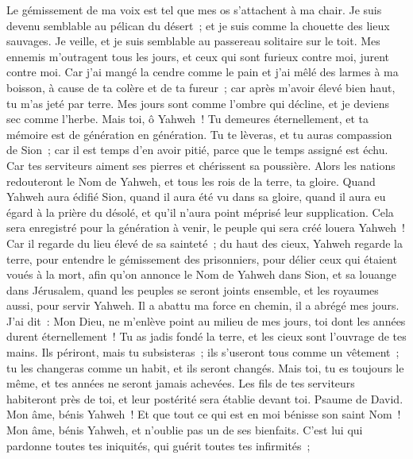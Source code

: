 \begin{multicols}{2}
Le gémissement de ma voix est tel que mes os s'attachent à ma chair.
Je suis devenu semblable au pélican du désert~; et je suis comme la chouette des lieux sauvages.
Je veille, et je suis semblable au passereau solitaire sur le toit.
Mes ennemis m'outragent tous les jours, et ceux qui sont furieux contre moi, jurent contre moi.
Car j'ai mangé la cendre comme le pain et j'ai mêlé des larmes à ma boisson,
à cause de ta colère et de ta fureur~; car après m'avoir élevé bien haut, tu m'as jeté par terre.
Mes jours sont comme l'ombre qui décline, et je deviens sec comme l'herbe.
Mais toi, ô Yahweh~! Tu demeures éternellement, et ta mémoire est de génération en génération.
Tu te lèveras, et tu auras compassion de Sion~; car il est temps d'en avoir pitié, parce que le temps assigné est échu.
Car tes serviteurs aiment ses pierres et chérissent sa poussière.
Alors les nations redouteront le Nom de Yahweh, et tous les rois de la terre, ta gloire.
Quand Yahweh aura édifié Sion, quand il aura été vu dans sa gloire,
quand il aura eu égard à la prière du désolé, et qu'il n'aura point méprisé leur supplication.
Cela sera enregistré pour la génération à venir, le peuple qui sera créé louera Yahweh~!
Car il regarde du lieu élevé de sa sainteté~; du haut des cieux, Yahweh regarde la terre,
pour entendre le gémissement des prisonniers, pour délier ceux qui étaient voués à la mort,
afin qu'on annonce le Nom de Yahweh dans Sion, et sa louange dans Jérusalem,
quand les peuples se seront joints ensemble, et les royaumes aussi, pour servir Yahweh.
Il a abattu ma force en chemin, il a abrégé mes jours.
J'ai dit~: Mon Dieu, ne m'enlève point au milieu de mes jours, toi dont les années durent éternellement~!
Tu as jadis fondé la terre, et les cieux sont l'ouvrage de tes mains.
Ils périront, mais tu subsisteras~; ils s'useront tous comme un vêtement~; tu les changeras comme un habit, et ils seront changés.
Mais toi, tu es toujours le même, et tes années ne seront jamais achevées.
Les fils de tes serviteurs habiteront près de toi, et leur postérité sera établie devant toi.
\VerseOne{}Psaume de David. Mon âme, bénis Yahweh~! Et que tout ce qui est en moi bénisse son saint Nom~!
Mon âme, bénis Yahweh, et n'oublie pas un de ses bienfaits.
C'est lui qui pardonne toutes tes iniquités, qui guérit toutes tes infirmités~;

\end{multicols}
